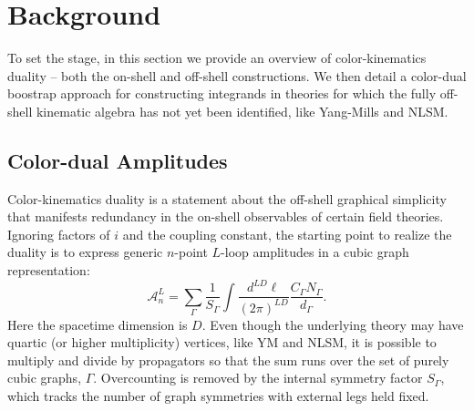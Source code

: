 \documentclass[11pt,letter]{article}
\begin{document}
\section{Background}\label{background}
To set the stage, in this section we provide an overview of
color-kinematics duality -- both the on-shell and off-shell
constructions. We then detail a color-dual boostrap approach for
constructing integrands in theories for which the fully off-shell kinematic
algebra has not yet been identified, like Yang-Mills and NLSM.
\subsection{Color-dual Amplitudes}\label{onShellCK}

Color-kinematics duality is a statement about the off-shell graphical
simplicity that manifests redundancy in the on-shell observables of
certain field theories. Ignoring factors of $i$ and the coupling
constant, the starting point to realize the duality is to express generic $n$-point $L$-loop amplitudes in a cubic graph representation:
\begin{equation}
  \mathcal{A}_n^L = \sum \limits_\Gamma \frac{1}{S_\Gamma} \int \frac{d^{LD}\ell}{(2\pi)^{LD}} \frac{C_\Gamma N_\Gamma}{d_\Gamma} .
  \label{eq:gen-amp}
\end{equation}
Here the spacetime dimension is $D$.  Even though the underlying
theory may have quartic (or higher multiplicity) vertices, like YM and NLSM, it is
possible to multiply and divide by propagators so that the sum runs
over the set of purely cubic graphs, $\Gamma$.  Overcounting is removed by
the internal symmetry factor $S_\Gamma$, which tracks the number of
graph symmetries with external legs held fixed.  
\end{document}
